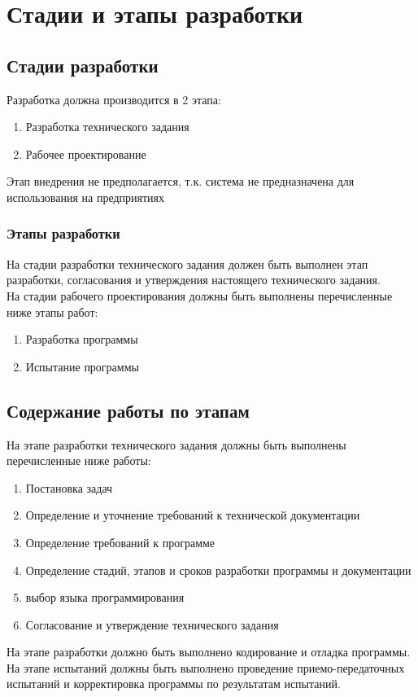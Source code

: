 \section{Стадии и этапы разработки}
\subsection{Стадии разработки}
Разработка должна производится в 2 этапа:
\begin{enumerate}
	\item Разработка технического задания
	\item Рабочее проектирование
\end{enumerate}

Этап внедрения не предполагается, т.к. система не предназначена для использования на предприятиях\\
\subsubsection{Этапы разработки}
На стадии разработки технического задания должен быть выполнен этап разработки, согласования и утверждения настоящего технического задания.\\

На стадии рабочего проектирования должны быть выполнены перечисленные ниже этапы работ:
\begin{enumerate}
	\item Разработка программы
	\item Испытание программы
\end{enumerate}

\subsection{Содержание работы по этапам}
На этапе разработки технического задания должны быть выполнены перечисленные ниже работы:
\begin{enumerate}
\item Постановка задач
\item Определение и уточнение требований к технической документации
\item Определение требований к программе
\item Определение стадий, этапов и сроков разработки программы и документации
\item выбор языка программирования
\item Согласование и утверждение технического задания
\end{enumerate}

На этапе разработки должно быть выполнено кодирование и отладка программы.\\

На этапе испытаний должны быть выполнено проведение приемо-передаточных испытаний и корректировка программы по результатам испытаний.\\
